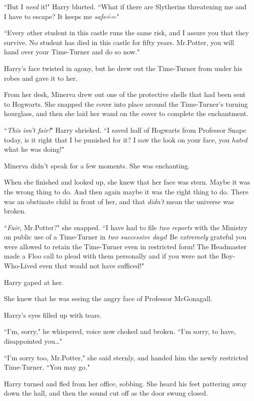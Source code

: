 ``But I \emph{need} it!" Harry blurted. ``What if there are Slytherins threatening me and I have to escape? It keeps me \emph{safe}\==="

``Every other student in this castle runs the same risk, and I assure you that they survive. No student has died in this castle for fifty years. Mr.\?Potter, you will hand over your Time-Turner and do so now."

Harry's face twisted in agony, but he drew out the Time-Turner from under his robes and gave it to her.

From her desk, Minerva drew out one of the protective shells that had been sent to Hogwarts. She snapped the cover into place around the Time-Turner's turning hourglass, and then she laid her wand on the cover to complete the enchantment.

``\emph{This isn't fair!}" Harry shrieked. ``I saved half of Hogwarts from Professor Snape today, is it right that I be punished for it? I saw the look on your face, you \emph{hated} what he was doing!"

Minerva didn't speak for a few moments. She was enchanting.

When she finished and looked up, she knew that her face was stern. Maybe it was the wrong thing to do. And then again maybe it was the right thing to do. There was an obstinate child in front of her, and that \emph{didn't} mean the universe was broken.

``\emph{Fair,} Mr.\?Potter?" she snapped. ``I have had to file \emph{two reports} with the Ministry on public use of a Time-Turner in \emph{two successive days}! Be \emph{extremely} grateful you were allowed to retain the Time-Turner even in restricted form! The Headmaster made a Floo call to plead with them personally and if you were not the Boy-Who-Lived even that would not have sufficed!"

Harry gaped at her.

She knew that he was seeing the angry face of Professor McGonagall.

Harry's eyes filled up with tears.

``I'm, sorry," he whispered, voice now choked and broken. ``I'm sorry, to have, disappointed you{\ldots}"

``I'm sorry too, Mr.\?Potter," she said sternly, and handed him the newly restricted Time-Turner. ``You may go."

Harry turned and fled from her office, sobbing. She heard his feet pattering away down the hall, and then the sound cut off as the door swung closed.

